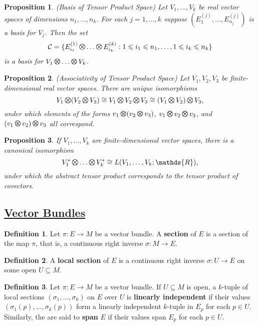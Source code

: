 \documentclass[11pt]{amsart}
\newtheorem*{proposition*}{Proposition}
\theoremstyle{definition}
\newtheorem*{definition*}{Definition}
\renewcommand\leq{\leqslant}
\renewcommand\:{\colon}
\newcommand{\calC}{\mathcal{C}}
\newcommand{\R}{\mathds{R}}
\newcommand{\1}{\mathds{1}}
\DeclareMathOperator*{\motimes}{\text{\raisebox{0.25ex}{\scalebox{0.8}{$\bigotimes$}}}}
\DeclareMathOperator*{\Motimes}{\text{\raisebox{0.35ex}{\scalebox{0.6}{$\bigotimes$}}}}
\begin{document}
\begin{proposition*}
	\textnormal{(Basis of Tensor Product Space)} Let $V_1, \dots, V_k$ be real vector spaces of dimensions $n_1, \dots, n_k$. For each $j =1, \dots, k$ suppose $(E_1^{(j)}, \dots, E_{n_j}^{(j)})$ is a basis for $V_j$. Then the set
		\[ \calC = \{ E_{i_1}^{(1)} \Motimes \dots \Motimes E_{i_k}^{(k)} : 1 \leq i_1 \leq n_1, \dots, 1 \leq i_k \leq n_k \} \]
	is a basis for $V_1 \motimes \dots \motimes V_k$.
\end{proposition*}

\begin{proposition*}
	\textnormal{(Associativity of Tensor Product Space)} Let $V_1, V_2, V_3$ be finite-dimensional real vector spaces. There are unique isomorphisms
		\[ V_1 \Motimes (V_2 \Motimes V_3) \cong V_1 \Motimes V_2 \Motimes V_3 \cong (V_1 \Motimes V_2) \Motimes V_3, \]
	under which elements of the forms $v_1 \motimes (v_2 \motimes v_3)$, $v_1 \motimes v_2 \motimes v_3$, and $(v_1 \motimes v_2) \motimes v_3$ all correspond.
\end{proposition*}

\begin{proposition*}
	If $V_1, \dots, V_k$ are finite-dimensional vector spaces, there is a canonical isomorphism 
		\[ V_1^* \Motimes \dots \Motimes V_k^* \cong L(V_1, \dots, V_k; \R), \]
	under which the abstract tensor product corresponds to the tensor product of covectors.
\end{proposition*}

\vskip20pt



\subsection*{\underline{Vector Bundles}}

\begin{definition*}
	Let $\pi\: E \to M$ be a vector bundle. A \textbf{section} of $E$ is a section of the map $\pi$, that is, a continuous right inverse $\sigma\: M\to E$.
\end{definition*}

\begin{definition*}
	A \textbf{local section} of $E$ is a continuous right inverse $\sigma\: U \to E$ on some open $U \subseteq M$.
\end{definition*}

\begin{definition*}
	Let $\pi\: E \to M$ be a vector bundle. If $U \subseteq M$ is open, a $k$-tuple of local sections $(\sigma_1, \dots, \sigma_k)$ on $E$ over $U$ is \textbf{linearly independent} if their values $(\sigma_1(p), \dots, \sigma_k(p))$ form a linearly independent $k$-tuple in $E_p$ for each $p \in U$. Similarly, the are said to \textbf{span} $E$ if their values span $E_p$ for each $p \in U$.
\end{definition*}
\end{document}
